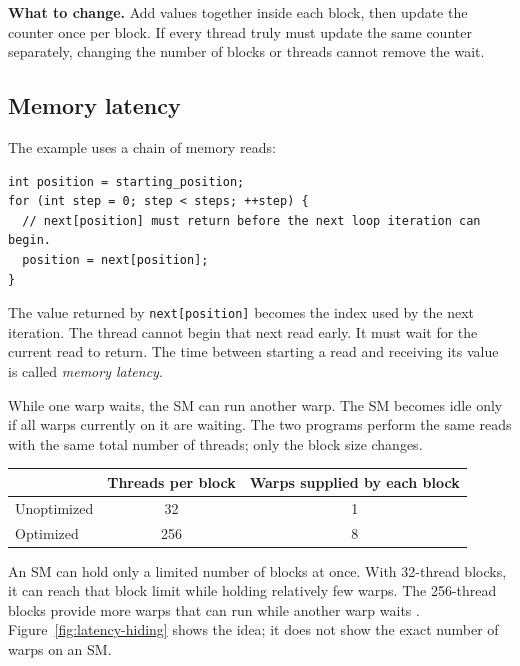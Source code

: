 \documentclass[11pt]{article}
\numberwithin{equation}{section}
\numberwithin{figure}{section}
\numberwithin{table}{section}
\newcommand{\code}[1]{\texttt{#1}}
\begin{document}
\textbf{What to change.}
Add values together inside each block, then update the counter once per block.  If
every thread truly must update the same counter separately, changing the number of
blocks or threads cannot remove the wait.

\subsection{Memory latency}

The example uses a chain of memory reads:
\begin{lstlisting}[language=CUDA,numbers=none,caption={Each read supplies the index for the next read.}]
int position = starting_position;
for (int step = 0; step < steps; ++step) {
  // next[position] must return before the next loop iteration can begin.
  position = next[position];
}
\end{lstlisting}
The value returned by \code{next[position]} becomes the index used by the next
iteration.  The thread cannot begin that next read early.  It must wait for the
current read to return.  The time between starting a read and receiving its value
is called \emph{memory latency}.

While one warp waits, the SM can run another warp.  The SM becomes idle only if all
warps currently on it are waiting.  The two programs perform the same reads with
the same total number of threads; only the block size changes.
\begin{center}
\begin{tabular}{@{}lcc@{}}
  \toprule
  & Threads per block & Warps supplied by each block \\
  \midrule
  Unoptimized & 32 & 1 \\
  Optimized & 256 & 8 \\
  \bottomrule
\end{tabular}
\end{center}
An SM can hold only a limited number of blocks at once.  With 32-thread blocks, it
can reach that block limit while holding relatively few warps.  The 256-thread
blocks provide more warps that can run while another warp waits
\cite{kirkhwu2010,ampere-tuning-guide}.  Figure~\ref{fig:latency-hiding} shows the
idea; it does not show the exact number of warps on an SM.
\end{document}
